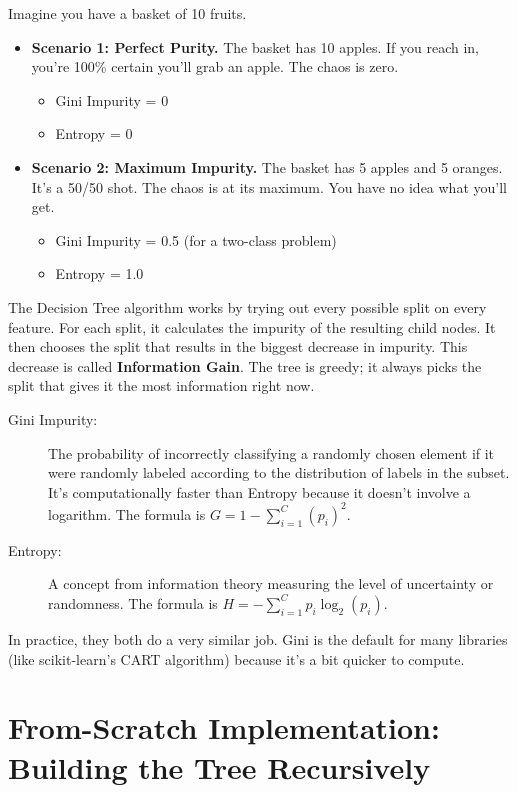 \documentclass[11pt, letterpaper, openany]{book}
\begin{document}
Imagine you have a basket of 10 fruits.
\begin{itemize}
    \item \textbf{Scenario 1: Perfect Purity.} The basket has 10 apples. If you reach in, you're 100\% certain you'll grab an apple. The chaos is zero.
    \begin{itemize}
        \item Gini Impurity = 0
        \item Entropy = 0
    \end{itemize}
    \item \textbf{Scenario 2: Maximum Impurity.} The basket has 5 apples and 5 oranges. It's a 50/50 shot. The chaos is at its maximum. You have no idea what you'll get.
    \begin{itemize}
        \item Gini Impurity = 0.5 (for a two-class problem)
        \item Entropy = 1.0
    \end{itemize}
\end{itemize}

The Decision Tree algorithm works by trying out every possible split on every feature. For each split, it calculates the impurity of the resulting child nodes. It then chooses the split that results in the biggest decrease in impurity. This decrease is called \textbf{Information Gain}. The tree is greedy; it always picks the split that gives it the most information right now.

\begin{description}
    \item[Gini Impurity:] The probability of incorrectly classifying a randomly chosen element if it were randomly labeled according to the distribution of labels in the subset. It's computationally faster than Entropy because it doesn't involve a logarithm. The formula is $G = 1 - \sum_{i=1}^{C} (p_i)^2$.
    \item[Entropy:] A concept from information theory measuring the level of uncertainty or randomness. The formula is $H = -\sum_{i=1}^{C} p_i \log_2(p_i)$.
\end{description}

In practice, they both do a very similar job. Gini is the default for many libraries (like scikit-learn's CART algorithm) because it's a bit quicker to compute.

\section{From-Scratch Implementation: Building the Tree Recursively}
\end{document}
